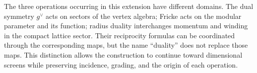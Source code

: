The three operations occurring in this extension have
different domains. The dual symmetry \(g^\vee\) acts on sectors
of the vertex algebra; Fricke acts on the modular parameter and
its function; radius duality interchanges momentum and winding
in the compact lattice sector. Their reciprocity formulas can
be coordinated through the corresponding maps, but the name
“duality” does not replace those maps. This distinction allows the
construction to continue toward dimensional screens while preserving
incidence, grading, and the origin of each operation.

